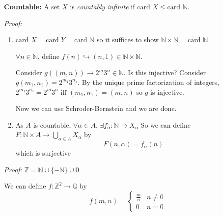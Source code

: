 \documentclass[12pt]{report}
\newcommand{\Z}{\mathbb{Z}}
\newcommand{\N}{\mathbb{N}}
\newcommand{\Q}{\mathbb{Q}}
\newcommand{\card}{\text{card }}
\newcommand{\inj}{\hookrightarrow}
\newenvironment*{tbox}[2][gray]{
    \begin{tcolorbox}[
        parbox=false,
        colback=#1!5!white,
        colframe=#1!75!black,
        breakable,
        title={#2}
    ]}
    {\end{tcolorbox}}
\begin{document}
    \textbf{Countable:} A set $X$ is \emph{countably infinite} if $\card X \leq \card \N$.

    \begin{tbox}{\textbf{Proposition:} 
        \begin{enumerate}[label=(\alph*)]
            \item If $X$ and $Y$ are countable, so is $X \times Y$.
            \item If $A$ is countable and $X_{\alpha}$ is countable for every $\alpha \in A$, then $\bigcup_{\alpha \in A} X_{\alpha}$ is countable.
        \end{enumerate}}
        \emph{Proof:} 
        \begin{enumerate}[label=(\alph*)]
            \item $\card X = \card Y =\card \N$ so it suffices to show $\N \times \N = \card \N$ 
            
            $\forall n \in \N$, define $f(n) \inj (n, 1) \in \N \times \N$.

            \color{red}
            Consider $g((m, n)) \to 2^m 3^n \in \N$. Is this injective? Consider $g(m_1, n_1) = 2^{m_1} 3^{n_1}$. By the unique prime factorization of integers, $2^{m_1} 3^{n_1} = 2^m 3^n$ iff $(m_1, n_1) = (m, n)$ so $g$ is injective.

            Now we can use Schroder-Bernstein and we are done. 

            \item As $A$ is countable, $\forall \alpha \in A$, $\exists f_{\alpha}: \N \to X_{\alpha}$ So we can define $F: \N \times A \to \bigcup_{\alpha \in A} X_{\alpha}$ by 
            \[F(n, \alpha) = f_{\alpha}(n)\]
            which is surjective 

            \color{black}

        \end{enumerate}

    \end{tbox}

    \begin{tbox}{\textbf{Corollary:} $\Z$ and $\Q$ are countable}
        \emph{Proof:} $\Z = \N \cup \{-\N\} \cup 0$ 

        We can define $f: \Z^2 \to \Q$ by 
        \[f(m, n) = \begin{cases}
            \frac{m}{n} & n \neq 0\\
            0 & n = 0 
        \end{cases}\] 
    \end{tbox}
\end{document}
